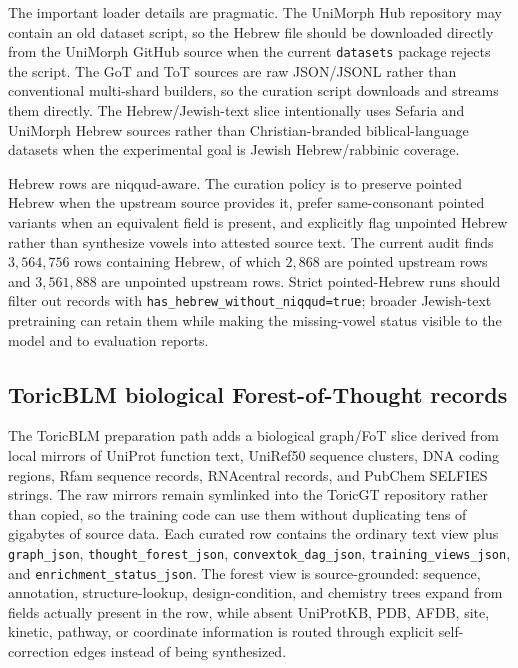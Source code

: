 \documentclass[11pt]{article}
\theoremstyle{definition}
\theoremstyle{plain}
\theoremstyle{remark}
\numberwithin{equation}{section}
\begin{document}
The important loader details are pragmatic.  The UniMorph Hub repository may contain an old dataset script, so the Hebrew file should be downloaded directly from the UniMorph GitHub source when the current \texttt{datasets} package rejects the script.  The GoT and ToT sources are raw JSON/JSONL rather than conventional multi-shard builders, so the curation script downloads and streams them directly.  The Hebrew/Jewish-text slice intentionally uses Sefaria and UniMorph Hebrew sources rather than Christian-branded biblical-language datasets when the experimental goal is Jewish Hebrew/rabbinic coverage.

Hebrew rows are niqqud-aware.  The curation policy is to preserve pointed Hebrew when the upstream source provides it, prefer same-consonant pointed variants when an equivalent field is present, and explicitly flag unpointed Hebrew rather than synthesize vowels into attested source text.  The current audit finds $3{,}564{,}756$ rows containing Hebrew, of which $2{,}868$ are pointed upstream rows and $3{,}561{,}888$ are unpointed upstream rows.  Strict pointed-Hebrew runs should filter out records with \texttt{has\_hebrew\_without\_niqqud=true}; broader Jewish-text pretraining can retain them while making the missing-vowel status visible to the model and to evaluation reports.

\subsection{ToricBLM biological Forest-of-Thought records}

The ToricBLM preparation path adds a biological graph/FoT slice derived from
local mirrors of UniProt function text, UniRef50 sequence clusters, DNA coding
regions, Rfam sequence records, RNAcentral records, and PubChem SELFIES strings.
The raw mirrors remain symlinked into the ToricGT repository rather than copied,
so the training code can use them without duplicating tens of gigabytes of
source data.  Each curated row contains the ordinary text view plus
\texttt{graph\_json}, \texttt{thought\_forest\_json},
\texttt{convextok\_dag\_json}, \texttt{training\_views\_json}, and
\texttt{enrichment\_status\_json}.  The forest view is source-grounded: sequence,
annotation, structure-lookup, design-condition, and chemistry trees expand from
fields actually present in the row, while absent UniProtKB, PDB, AFDB, site,
kinetic, pathway, or coordinate information is routed through explicit
self-correction edges instead of being synthesized.
\end{document}
